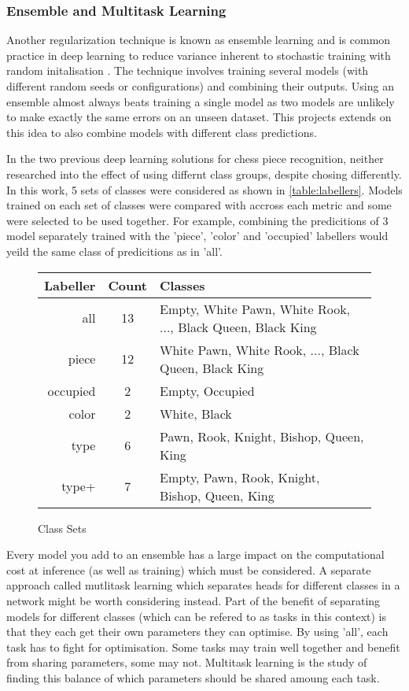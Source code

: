 \subsubsection{Ensemble and Multitask Learning}
Another regularization technique is known as ensemble learning and is common practice in deep learning to reduce variance inherent to stochastic training 
with random initalisation \cite{deeplearningbook}.  The technique involves training several models (with different random seeds or configurations) and 
combining their outputs. Using an ensemble almost always beats training a single model as two models are unlikely to make exactly the same errors on an unseen dataset.
This projects extends on this idea to also combine models with different class predictions.

In the two previous deep learning solutions for chess piece recognition, neither researched into the effect of using differnt class groups, 
despite chosing differently.
In this work, 5 sets of classes were considered as shown in \autoref{table:labellers}.  Models trained on each set of classes were compared
with accross each metric and some were selected to be used together.  For example, combining the predicitions of 3 model separately trained with
the 'piece', 'color' and 'occupied' labellers would yeild the same class of predicitions as in 'all'.
\begin{center}
\begin{figure}
\begin{tabular}{|r|c|l|}
    \hline
    Labeller & Count & Classes \\
    \hline
    all & 13 & Empty, White Pawn, White Rook, ..., Black Queen, Black King \\
    piece & 12 & White Pawn, White Rook, ..., Black Queen, Black King \\
    occupied & 2 & Empty, Occupied \\
    color & 2 & White, Black \\
    type & 6 & Pawn, Rook, Knight, Bishop, Queen, King \\
    type+ & 7 & Empty, Pawn, Rook, Knight, Bishop, Queen, King \\
    \hline
\end{tabular}
\caption{Class Sets}
\label{table:labellers}
\end{figure}
\end{center}

Every model you add to an ensemble has a large impact on the computational cost at inference (as well as training) which must be considered.  A separate
approach called mutlitask learning which separates heads for different classes in a network might be worth considering instead.  
Part of the benefit of separating models for different classes (which can be 
refered to as tasks in this context) is that they each get their own parameters they can optimise.  By using 'all', each task has to fight for optimisation.
Some tasks may train well together and benefit from sharing parameters, some may not.  Multitask learning is the study of finding this balance of which 
parameters should be shared amoung each task.

